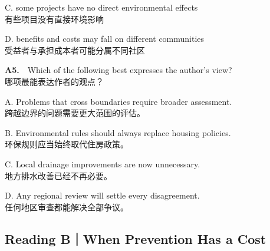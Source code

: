 \documentclass[a4paper,11pt,openany]{report}
\newcommand{\zhline}[1]{{\CJKsf\color{bodygrey}#1}}
\begin{document}
\begin{samepage}
C. some projects have no direct environmental effects\\
\zhline{有些项目没有直接环境影响}
\par\end{samepage}

\begin{samepage}
D. benefits and costs may fall on different communities\\
\zhline{受益者与承担成本者可能分属不同社区}
\par\end{samepage}

\begin{samepage}
\textbf{A5.}　Which of the following best expresses the author's view?\\
\zhline{哪项最能表达作者的观点？}
\par\end{samepage}

\begin{samepage}
A. Problems that cross boundaries require broader assessment.\\
\zhline{跨越边界的问题需要更大范围的评估。}
\par\end{samepage}

\begin{samepage}
B. Environmental rules should always replace housing policies.\\
\zhline{环保规则应当始终取代住房政策。}
\par\end{samepage}

\begin{samepage}
C. Local drainage improvements are now unnecessary.\\
\zhline{地方排水改善已经不再必要。}
\par\end{samepage}

\begin{samepage}
D. Any regional review will settle every disagreement.\\
\zhline{任何地区审查都能解决全部争议。}
\par\end{samepage}

\subsection{Reading B｜When Prevention Has a Cost}\label{reading-bwhen-prevention-has-a-cost-1}
\end{document}
